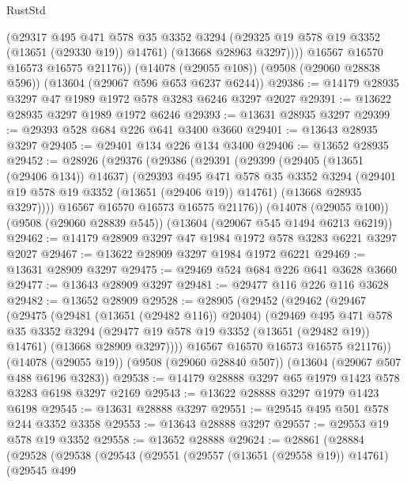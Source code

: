 \begin{lexlean}{RustStd}
\begin{coremodule}
            (@29317
              @495
              @471
              @578
              @35
              @3352
              @3294
              (@29325 @19 @578 @19 @3352 (@13651 (@29330 @19)) @14761)
              (@13668 @28963 @3297))))
        @16567
        @16570
        @16573
        @16575
        @21176))
    (@14078 (@29055 @108))
    (@9508 (@29060 @28838 @596))
    (@13604 (@29067 @596 @653 @6237 @6244))
@29386 := @14179 @28935 @3297 @47 @1989 @1972 @578 @3283 @6246 @3297 @2027
@29391 := @13622 @28935 @3297 @1989 @1972 @6246
@29393 := @13631 @28935 @3297
@29399 := @29393 @528 @684 @226 @641 @3400 @3660
@29401 := @13643 @28935 @3297
@29405 := @29401 @134 @226 @134 @3400
@29406 := @13652 @28935
@29452 := @28926
    (@29376
      (@29386
        (@29391
          (@29399
            (@29405 (@13651 (@29406 @134)) @14637)
            (@29393
              @495
              @471
              @578
              @35
              @3352
              @3294
              (@29401 @19 @578 @19 @3352 (@13651 (@29406 @19)) @14761)
              (@13668 @28935 @3297))))
        @16567
        @16570
        @16573
        @16575
        @21176))
    (@14078 (@29055 @100))
    (@9508 (@29060 @28839 @545))
    (@13604 (@29067 @545 @1494 @6213 @6219))
@29462 := @14179 @28909 @3297 @47 @1984 @1972 @578 @3283 @6221 @3297 @2027
@29467 := @13622 @28909 @3297 @1984 @1972 @6221
@29469 := @13631 @28909 @3297
@29475 := @29469 @524 @684 @226 @641 @3628 @3660
@29477 := @13643 @28909 @3297
@29481 := @29477 @116 @226 @116 @3628
@29482 := @13652 @28909
@29528 := @28905
    (@29452
      (@29462
        (@29467
          (@29475
            (@29481 (@13651 (@29482 @116)) @20404)
            (@29469
              @495
              @471
              @578
              @35
              @3352
              @3294
              (@29477 @19 @578 @19 @3352 (@13651 (@29482 @19)) @14761)
              (@13668 @28909 @3297))))
        @16567
        @16570
        @16573
        @16575
        @21176))
    (@14078 (@29055 @19))
    (@9508 (@29060 @28840 @507))
    (@13604 (@29067 @507 @488 @6196 @3283))
@29538 := @14179 @28888 @3297 @65 @1979 @1423 @578 @3283 @6198 @3297 @2169
@29543 := @13622 @28888 @3297 @1979 @1423 @6198
@29545 := @13631 @28888 @3297
@29551 := @29545 @495 @501 @578 @244 @3352 @3358
@29553 := @13643 @28888 @3297
@29557 := @29553 @19 @578 @19 @3352
@29558 := @13652 @28888
@29624 := @28861
    (@28884
      (@29528
        (@29538
          (@29543
            (@29551
              (@29557 (@13651 (@29558 @19)) @14761)
              (@29545
                @499

\end{coremodule}
\end{lexlean}
